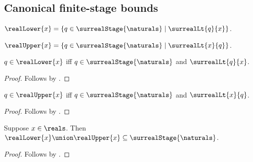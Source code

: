 \subsection{Canonical finite-stage bounds}

\begin{definition}\label{surreal_real_lower}
    $\realLower{x}=
        \{q\in\surrealStage{\naturals}\mid\surrealLt{q}{x}\}$.
\end{definition}

\begin{definition}\label{surreal_real_upper}
    $\realUpper{x}=
        \{q\in\surrealStage{\naturals}\mid\surrealLt{x}{q}\}$.
\end{definition}

\begin{proposition}\label{surreal_real_lower_iff}
    $q\in\realLower{x}$ iff
        $q\in\surrealStage{\naturals}$ and $\surrealLt{q}{x}$.
\end{proposition}
\begin{proof}
    Follows by .
\end{proof}

\begin{proposition}\label{surreal_real_upper_iff}
    $q\in\realUpper{x}$ iff
        $q\in\surrealStage{\naturals}$ and $\surrealLt{x}{q}$.
\end{proposition}
\begin{proof}
    Follows by .
\end{proof}

\begin{proposition}\label{surreal_real_bounds_finite_stage}
    Suppose $x\in\reals$.
    Then $\realLower{x}\union\realUpper{x}
        \subseteq\surrealStage{\naturals}$.
\end{proposition}
\begin{proof}
    Follows by
        .
\end{proof}

